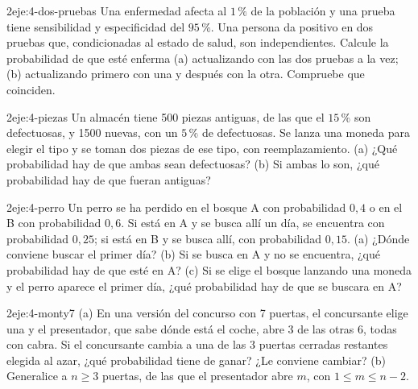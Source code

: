 \begin{ejercicio}{2}{eje:4-dos-pruebas}
Una enfermedad afecta al $1\,\%$ de la población y una prueba tiene sensibilidad y especificidad del $95\,\%$. Una persona da positivo en dos pruebas que, condicionadas al estado de salud, son independientes. Calcule la probabilidad de que esté enferma (a) actualizando con las dos pruebas a la vez; (b) actualizando primero con una y después con la otra. Compruebe que coinciden.
\end{ejercicio}

\begin{ejercicio}{2}{eje:4-piezas}
Un almacén tiene 500 piezas antiguas, de las que el $15\,\%$ son defectuosas, y 1500 nuevas, con un $5\,\%$ de defectuosas. Se lanza una moneda para elegir el tipo y se toman dos piezas de ese tipo, con reemplazamiento. (a) ¿Qué probabilidad hay de que ambas sean defectuosas? (b) Si ambas lo son, ¿qué probabilidad hay de que fueran antiguas?
\end{ejercicio}

\begin{ejercicio}{2}{eje:4-perro}
Un perro se ha perdido en el bosque A con probabilidad $0{,}4$ o en el B con probabilidad $0{,}6$. Si está en A y se busca allí un día, se encuentra con probabilidad $0{,}25$; si está en B y se busca allí, con probabilidad $0{,}15$. (a) ¿Dónde conviene buscar el primer día? (b) Si se busca en A y no se encuentra, ¿qué probabilidad hay de que esté en A? (c) Si se elige el bosque lanzando una moneda y el perro aparece el primer día, ¿qué probabilidad hay de que se buscara en A?
\end{ejercicio}

\begin{ejercicio}{2}{eje:4-monty7}
(a) En una versión del concurso con 7 puertas, el concursante elige una y el presentador, que sabe dónde está el coche, abre 3 de las otras 6, todas con cabra. Si el concursante cambia a una de las 3 puertas cerradas restantes elegida al azar, ¿qué probabilidad tiene de ganar? ¿Le conviene cambiar? (b) Generalice a $n\ge3$ puertas, de las que el presentador abre $m$, con $1\le m\le n-2$.
\end{ejercicio}


